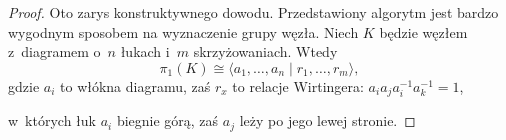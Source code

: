 \begin{proof}
    Oto zarys konstruktywnego dowodu.
    Przedstawiony algorytm jest bardzo wygodnym sposobem na wyznaczenie grupy węzła.
    Niech $K$ będzie węzłem z~diagramem o~$n$ łukach i~$m$ skrzyżowaniach.
    Wtedy
    \begin{equation}
        \pi_1(K) \cong \langle a_1, \ldots, a_n \mid r_1, \ldots, r_m\rangle,
    \end{equation}
    gdzie $a_i$ to włókna diagramu, zaś $r_x$ to relacje Wirtingera: $a_ia_ja_i^{-1}a_k^{-1}=1$,
\begin{comment}
    \[
    \begin{tikzpicture}[baseline=-0.65ex,scale=0.15]
    \begin{knot}[clip width=15]
        \strand[semithick,-Latex] (-5, -5) to (5, 5);
        \strand[semithick,-Latex] (-5, 5) to (5, -5);
        \node[darkblue] at (5, 5)[below right] {$a_i$};
        \node[darkblue] at (5, -5)[above right] {$a_k$};
        \node[darkblue] at (-5, 5)[below left] {$a_j$};
    \end{knot}
    \end{tikzpicture}
    \quad\quad
    \begin{tikzpicture}[baseline=-0.65ex,scale=0.15]
    \begin{knot}[clip width=15, flip crossing/.list={1}]
        \strand[semithick,-Latex] (-5, -5) to (5, 5);
        \strand[semithick,-Latex] (-5, 5) to (5, -5);
        \node[darkblue] at (5, 5)[below right] {$a_j$};
        \node[darkblue] at (-5, -5)[above left] {$a_k$};
        \node[darkblue] at (-5, 5)[below left] {$a_i$};
    \end{knot}
    \end{tikzpicture}
    \]
\end{comment}
    w~których łuk $a_i$ biegnie górą, zaś $a_j$ leży po jego lewej stronie.
\end{proof}

